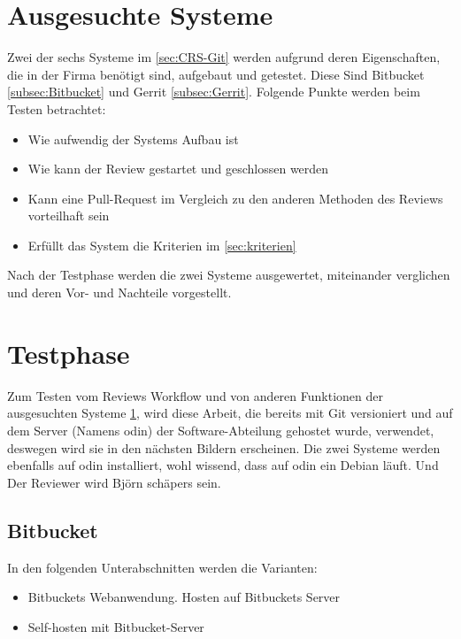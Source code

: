 \section{Ausgesuchte Systeme}
\label{sec:Ausgesuchte Systeme}

Zwei der sechs Systeme im \cref{sec:CRS-Git} werden aufgrund deren Eigenschaften, die in der Firma benötigt sind, aufgebaut und getestet. Diese Sind Bitbucket \cref{subsec:Bitbucket} und Gerrit \cref{subsec:Gerrit}.
Folgende Punkte werden beim Testen betrachtet:
\begin{itemize}
	\item Wie aufwendig der Systems Aufbau ist
	\item Wie kann der Review gestartet und geschlossen werden
	\item Kann eine Pull-Request im Vergleich zu den anderen Methoden des Reviews vorteilhaft sein
	\item Erfüllt das System die Kriterien im \cref{sec:kriterien}
\end{itemize}

Nach der Testphase werden die zwei Systeme ausgewertet, miteinander verglichen und deren Vor- und Nachteile vorgestellt.

\section{Testphase}
\label{sec:testphase}

Zum Testen vom Reviews Workflow und von anderen Funktionen der ausgesuchten Systeme \cref{sec:Ausgesuchte Systeme}, wird diese Arbeit, die bereits mit Git versioniert und auf dem Server (Namens odin) der Software-Abteilung gehostet wurde, verwendet, deswegen wird sie in den nächsten Bildern erscheinen.  Die zwei Systeme werden ebenfalls auf odin installiert, wohl wissend, dass auf odin ein Debian läuft. Und Der Reviewer wird Björn schäpers \cite{Bjoern} sein.

\subsection{Bitbucket}
\label{subsec:Test_Bitbucket}

In den folgenden Unterabschnitten werden die Varianten:
\begin{itemize}
	\item Bitbuckets Webanwendung. Hosten auf Bitbuckets Server
	\item Self-hosten mit Bitbucket-Server
\end{itemize}

